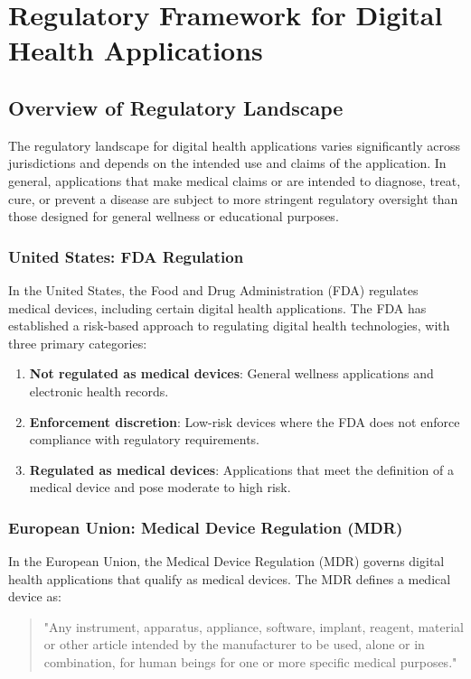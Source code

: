 \chapter{Regulatory Framework for Digital Health Applications}

\section{Overview of Regulatory Landscape}
The regulatory landscape for digital health applications varies significantly across jurisdictions and depends on the intended use and claims of the application. In general, applications that make medical claims or are intended to diagnose, treat, cure, or prevent a disease are subject to more stringent regulatory oversight than those designed for general wellness or educational purposes.

\subsection{United States: FDA Regulation}
In the United States, the Food and Drug Administration (FDA) regulates medical devices, including certain digital health applications. The FDA has established a risk-based approach to regulating digital health technologies, with three primary categories:

\begin{enumerate}
    \item \textbf{Not regulated as medical devices}: General wellness applications and electronic health records.
    \item \textbf{Enforcement discretion}: Low-risk devices where the FDA does not enforce compliance with regulatory requirements.
    \item \textbf{Regulated as medical devices}: Applications that meet the definition of a medical device and pose moderate to high risk.
\end{enumerate}

\subsection{European Union: Medical Device Regulation (MDR)}
In the European Union, the Medical Device Regulation (MDR) governs digital health applications that qualify as medical devices. The MDR defines a medical device as:

\begin{quote}
"Any instrument, apparatus, appliance, software, implant, reagent, material or other article intended by the manufacturer to be used, alone or in combination, for human beings for one or more specific medical purposes."
\end{quote}

